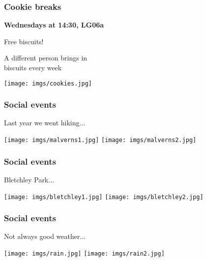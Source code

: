 \documentclass[aspectratio=169]{beamer}
\newcommand{\imagewidth}{14em}
\begin{document}
\begin{frame}
    \frametitle{Cookie breaks}
    \centering

    \textbf{\LARGE Wednesdays at 14:30, LG06a}

    \vspace{1em}

    \begin{minipage}{0.4\textwidth}
        \centering
        \Large

        \alert{Free biscuits!}

        \vspace{1em}

        A different person brings in \\
        biscuits every week
    \end{minipage}
    \qquad
    \begin{minipage}{0.4\textwidth}
        \texttt{[image: imgs/cookies.jpg]}
    \end{minipage}
\end{frame}
\begin{frame}
    \frametitle{Social events}
    \centering

    \Large
    Last year we went hiking...

    \vspace{1em}

    \texttt{[image: imgs/malverns1.jpg]}
    \texttt{[image: imgs/malverns2.jpg]}


\end{frame}
\begin{frame}
    \frametitle{Social events}
    \centering

    \Large
    Bletchley Park...

    \vspace{1em}

    \texttt{[image: imgs/bletchley1.jpg]}
    \texttt{[image: imgs/bletchley2.jpg]}

\end{frame}

\begin{frame}
    \frametitle{Social events}
    \centering

    \Large
    Not always good weather...

    \vspace{1em}

    \texttt{[image: imgs/rain.jpg]}
    \texttt{[image: imgs/rain2.jpg]}

\end{frame}
\end{document}
